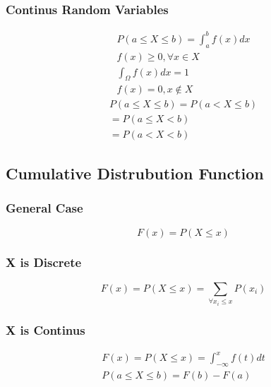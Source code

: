 \documentclass{article}
\begin{document}
    \subsubsection{Continus Random Variables}
    \begin{equation}
    \begin{split}
        P(a \leq X \leq b) = \int_a^b {f(x)dx} \\
        f(x) \geq 0 , \forall x \in X \\
        \int_{\Omega} f(x) dx = 1 \\
        f(x) = 0, x \notin X
    \end{split}
    \end{equation}
    \begin{equation}
    \begin{split}
        P(a \leq X \leq b) = P(a < X \leq b) \\
        = P(a \leq X < b) \\
        = P(a < X < b)
    \end{split}
    \end{equation}


    \subsection{Cumulative Distrubution Function}
    \subsubsection{General Case}
    \begin{equation}
        F(x) = P(X \leq x)
    \end{equation}

    \subsubsection{X is Discrete}
    \begin{equation}
        F(x) = P(X \leq x) = \sum_{\forall x_i \leq x} P(x_i)
    \end{equation}

    \subsubsection{X is Continus}
    \begin{gather}
        F(x) = P(X \leq x) = \int_{-\infty}^{x} f(t) dt \\
        P(a \leq X \leq b) = F(b) - F(a)
    \end{gather}
\end{document}
